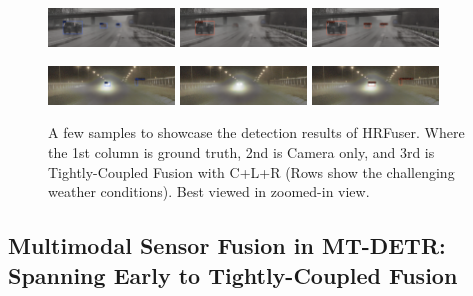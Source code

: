 \documentclass[report.tex]{subfiles}
\begin{document}
\begin{figure}[h!]
        \includegraphics[width=0.3\textwidth]{images/results/hrfuser/samples/light_fog_day/2018-02-04_13-26-00_00100_gt.png}
        \includegraphics[width=0.3\textwidth]{images/results/hrfuser/samples/light_fog_day/2018-02-04_13-26-00_00100_former_c.png}
        \includegraphics[width=0.3\textwidth]{images/results/hrfuser/samples/light_fog_day/2018-02-04_13-26-00_00100_former_clr.png}
      
        \includegraphics[width=0.3\textwidth]{images/results/hrfuser/samples/dense_fog_night/2018-02-07_17-56-35_00110.png}
        \includegraphics[width=0.3\textwidth]{images/results/hrfuser/samples/dense_fog_night/2018-02-07_17-56-35_00110_former_c.png}
        \includegraphics[width=0.3\textwidth]{images/results/hrfuser/samples/dense_fog_night/2018-02-07_17-56-35_00110_former_clr.png}
      
        \caption{A few samples to showcase the detection results of HRFuser. Where the 1st column is ground truth, 2nd is Camera only, and 3rd is Tightly-Coupled Fusion with C+L+R (Rows show the challenging weather conditions). Best viewed in zoomed-in view.}
        \label{fig:hrfuser_on_dense}
      \end{figure}
    
    

    \FloatBarrier
    \subsection{Multimodal Sensor Fusion in MT-DETR: Spanning Early to Tightly-Coupled Fusion}
\end{document}
